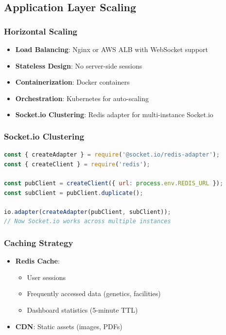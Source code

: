 \documentclass[11pt,a4paper]{article}
\begin{document}
\subsection{Application Layer Scaling}

\subsubsection{Horizontal Scaling}
\begin{itemize}
    \item \textbf{Load Balancing}: Nginx or AWS ALB with WebSocket support
    \item \textbf{Stateless Design}: No server-side sessions
    \item \textbf{Containerization}: Docker containers
    \item \textbf{Orchestration}: Kubernetes for auto-scaling
    \item \textbf{Socket.io Clustering}: Redis adapter for multi-instance Socket.io
\end{itemize}

\subsubsection{Socket.io Clustering}
\begin{lstlisting}[language=JavaScript, caption=Socket.io Redis Adapter]
const { createAdapter } = require('@socket.io/redis-adapter');
const { createClient } = require('redis');

const pubClient = createClient({ url: process.env.REDIS_URL });
const subClient = pubClient.duplicate();

io.adapter(createAdapter(pubClient, subClient));
// Now Socket.io works across multiple instances
\end{lstlisting}

\subsubsection{Caching Strategy}
\begin{itemize}
    \item \textbf{Redis Cache}: 
    \begin{itemize}
        \item User sessions
        \item Frequently accessed data (genetics, facilities)
        \item Dashboard statistics (5-minute TTL)
    \end{itemize}
    \item \textbf{CDN}: Static assets (images, PDFs)
\end{itemize}
\end{document}
